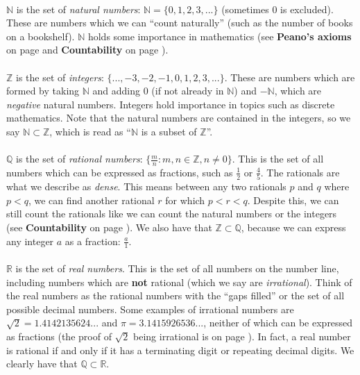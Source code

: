 \documentclass[12pt, a4paper, titlepage, twoside]{article}
\newcommand*{\N}{\mathbb{N}}
\newcommand*{\Z}{\mathbb{Z}}
\newcommand*{\Q}{\mathbb{Q}}
\newcommand*{\R}{\mathbb{R}}
\begin{document}
	\paragraph{}
	$\N$ is the set of \textit{natural numbers}: $\N = \{0,1,2,3,...\}$ (sometimes $0$ is excluded). These are numbers which we can 
	``count	naturally'' (such as the number of books on a bookshelf). $\N$ holds some importance in mathematics (see 
	\textbf{Peano's axioms} on page \pageref*{fr:peano} and \textbf{Countability} on page \pageref*{fr:countability}).
	
	\paragraph{}
	$\Z$ is the set of \textit{integers}: $\{..., -3, -2, -1, 0, 1, 2, 3, ...\}$. These are numbers which are formed by taking $\N$ and adding
	0 (if not already in $\N$) and $-\N$, which are \textit{negative} natural numbers. Integers hold importance in topics such as
	discrete mathematics. Note that the natural numbers are contained in the integers, so we say $\N \subset \Z$, which is read as
	``$\N$ is a subset of $\Z$''.
	
	\paragraph{}
	$\Q$ is the set of \textit{rational numbers}: $\{\frac{m}{n} : m,n \in \Z, n \neq 0\}$. This is the set of all numbers which can be
	expressed as fractions, such as $\frac{1}{2}$ or $\frac{4}{5}$. The rationals are what we describe as \textit{dense}. This means
	between any two rationals $p$ and $q$ where $p < q$, we can find another rational $r$ for which $p < r < q$. Despite this, we can
	still count the rationals like we can count the natural numbers or the integers (see \textbf{Countability} on page 
	\pageref*{fr:countability}). We also have that $\Z \subset \Q$, because we can express any integer $a$ as a fraction: $\frac{a}{1}$.
	
	\paragraph{}
	$\R$ is the set of \textit{real numbers}. This is the set of all numbers on the number line, including numbers which are \textbf{not}
	rational (which we say are \textit{irrational}). Think of the real numbers as the rational numbers with the ``gaps filled'' or the set of
	all possible decimal numbers. Some examples of irrational numbers are $\sqrt{2} = 1.4142135624...$ and $\pi = 3.1415926536...$, 
	neither of which can be expressed as fractions (the proof of $\sqrt{2}$ being irrational is on page \pageref*{pf:root2}). In fact, a real
	number is rational if and only if it has a terminating digit or repeating decimal digits. We clearly have that $\Q \subset \R$.
	
\end{document}
